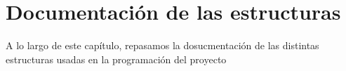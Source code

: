 
\chapter{Documentación de las estructuras}
A lo largo de este capítulo, repasamos la dosucmentación de las distintas estructuras usadas en la programación del 
proyecto


















